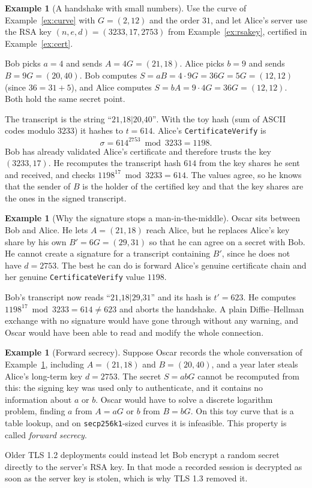 \documentclass[11pt,a4paper]{article}
\theoremstyle{definition}
\newtheorem{example}[definition]{Example}
\begin{document}
\begin{example}[A handshake with small numbers]\label{ex:tls}
Use the curve of Example~\ref{ex:curve} with $G=(2,12)$ and the order $31$, and let Alice's server use the RSA key $(n,e,d)=(3233,17,2753)$ from Example~\ref{ex:rsakey}, certified in Example~\ref{ex:cert}.

Bob picks $a=4$ and sends $A=4G=(21,18)$. Alice picks $b=9$ and sends $B=9G=(20,40)$. Bob computes $S=aB=4\cdot 9G=36G=5G=(12,12)$ (since $36=31+5$), and Alice computes $S=bA=9\cdot 4G=36G=(12,12)$. Both hold the same secret point.

The transcript is the string $\text{``21,18|20,40''}$. With the toy hash (sum of ASCII codes modulo $3233$) it hashes to $t=614$. Alice's \texttt{CertificateVerify} is
\[
\sigma=614^{2753} \bmod 3233=1198.
\]
Bob has already validated Alice's certificate and therefore trusts the key $(3233,17)$. He recomputes the transcript hash $614$ from the key shares he sent and received, and checks $1198^{17} \bmod 3233=614$. The values agree, so he knows that the sender of $B$ is the holder of the certified key and that the key shares are the ones in the signed transcript.
\end{example}

\begin{example}[Why the signature stops a man-in-the-middle]\label{ex:mitm}
Oscar sits between Bob and Alice. He lets $A=(21,18)$ reach Alice, but he replaces Alice's key share by his own $B'=6G=(29,31)$ so that he can agree on a secret with Bob. He cannot create a signature for a transcript containing $B'$, since he does not have $d=2753$. The best he can do is forward Alice's genuine certificate chain and her genuine \texttt{CertificateVerify} value $1198$.

Bob's transcript now reads $\text{``21,18|29,31''}$ and its hash is $t'=623$. He computes $1198^{17} \bmod 3233=614\ne 623$ and aborts the handshake. A plain Diffie--Hellman exchange with no signature would have gone through without any warning, and Oscar would have been able to read and modify the whole connection.
\end{example}

\begin{example}[Forward secrecy]\label{ex:fs-tls}
Suppose Oscar records the whole conversation of Example~\ref{ex:tls}, including $A=(21,18)$ and $B=(20,40)$, and a year later steals Alice's long-term key $d=2753$. The secret $S=abG$ cannot be recomputed from this: the signing key was used only to authenticate, and it contains no information about $a$ or $b$. Oscar would have to solve a discrete logarithm problem, finding $a$ from $A=aG$ or $b$ from $B=bG$. On this toy curve that is a table lookup, and on \texttt{secp256k1}-sized curves it is infeasible. This property is called \emph{forward secrecy}.

Older TLS 1.2 deployments could instead let Bob encrypt a random secret directly to the server's RSA key. In that mode a recorded session is decrypted as soon as the server key is stolen, which is why TLS 1.3 removed it.
\end{example}
\end{document}
